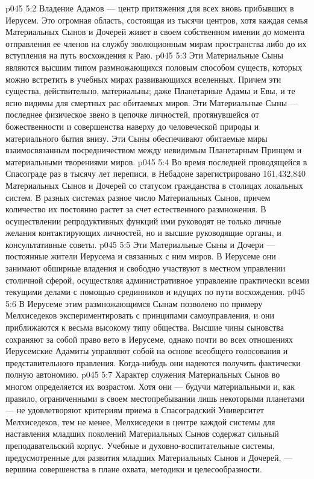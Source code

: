 \vs p045 5:2 Владение Адамов --- центр притяжения для всех вновь прибывших в Иерусем. Это огромная область, состоящая из тысячи центров, хотя каждая семья Материальных Сынов и Дочерей живет в своем собственном имении до момента отправления ее членов на службу эволюционным мирам пространства либо до их вступления на путь восхождения к Раю.
\vs p045 5:3 Эти Материальные Сыны являются высшим типом размножающихся половым способом существ, которых можно встретить в учебных мирах развивающихся вселенных. Причем эти существа, действительно, материальны; даже Планетарные Адамы и Евы, и те ясно видимы для смертных рас обитаемых миров. Эти Материальные Сыны --- последнее физическое звено в цепочке личностей, протянувшейся от божественности и совершенства наверху до человеческой природы и материального бытия внизу. Эти Сыны обеспечивают обитаемые миры взаимосвязанным посредничеством между невидимым Планетарным Принцем и материальными творениями миров.
\vs p045 5:4 \pc Во время последней проводящейся в Спасограде раз в тысячу лет переписи, в Небадоне зарегистрировано 161,432,840 Материальных Сынов и Дочерей со статусом гражданства в столицах локальных систем. В разных системах разное число Материальных Сынов, причем количество их постоянно растет за счет естественного размножения. В осуществлении репродуктивных функций ими руководят не только личные желания контактирующих личностей, но и высшие руководящие органы, и консультативные советы.
\vs p045 5:5 \pc Эти Материальные Сыны и Дочери --- постоянные жители Иерусема и связанных с ним миров. В Иерусеме они занимают обширные владения и свободно участвуют в местном управлении столичной сферой, осуществляя административное управление практически всеми текущими делами с помощью срединников и идущих по пути восхождения.
\vs p045 5:6 В Иерусеме этим размножающимся Сынам позволено по примеру Мелхиседеков экспериментировать с принципами самоуправления, и они приближаются к весьма высокому типу общества. Высшие чины сыновства сохраняют за собой право вето в Иерусеме, однако почти во всех отношениях Иерусемские Адамиты управляют собой на основе всеобщего голосования и представительного правления. Когда\hyp{}нибудь они надеются получить фактически полную автономию.
\vs p045 5:7 Характер служения Материальных Сынов во многом определяется их возрастом. Хотя они --- будучи материальными и, как правило, ограниченными в своем местопребывании лишь некоторыми планетами --- не удовлетворяют критериям приема в Спасоградский Университет Мелхиседеков, тем не менее, Мелхиседеки в центре каждой системы для наставления младших поколений Материальных Сынов содержат сильный преподавательский корпус. Учебные и духовно\hyp{}воспитательные системы, предусмотренные для развития младших Материальных Сынов и Дочерей, --- вершина совершенства в плане охвата, методики и целесообразности.
